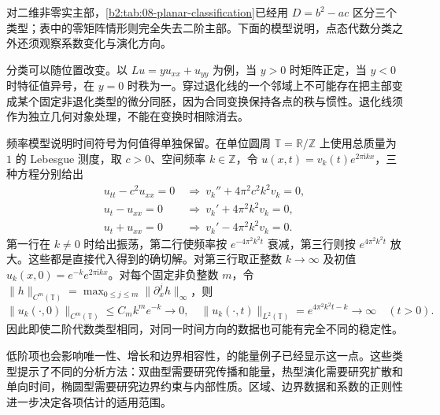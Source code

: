 对二维非零实主部，\cref{b2:tab:08-planar-classification}已经用 \(D=b^2-ac\) 区分三个类型；表中的零矩阵情形则完全失去二阶主部。下面的模型说明，点态代数分类之外还须观察系数变化与演化方向。

\ProseParagraphBreak

分类可以随位置改变。以 \(Lu=y u_{xx}+u_{yy}\) 为例，当 \(y>0\) 时矩阵正定，当 \(y<0\) 时特征值异号，在 \(y=0\) 时秩为一。穿过退化线的一个邻域上不可能存在把主部变成某个固定非退化类型的微分同胚，因为合同变换保持各点的秩与惯性。退化线须作为独立几何对象处理，不能在变换时相除消去。

\ProseParagraphBreak

频率模型说明时间符号为何值得单独保留。在单位圆周 \(\mathbb T=\mathbb R/\mathbb Z\) 上使用总质量为 \(1\) 的 Lebesgue 测度，取 \(c>0\)、空间频率 \(k\in\mathbb Z\)，令 \(u(x,t)=v_k(t)e^{2\pi\mathrm i kx}\)，三种方程分别给出
\[
 \begin{aligned}
 u_{tt}-c^2u_{xx}=0&\ \Longrightarrow\ v_k''+4\pi^2c^2k^2v_k=0,\\
 u_t-u_{xx}=0&\ \Longrightarrow\ v_k'+4\pi^2k^2v_k=0,\\
 u_t+u_{xx}=0&\ \Longrightarrow\ v_k'-4\pi^2k^2v_k=0.
 \end{aligned}
\]
第一行在 \(k\ne0\) 时给出振荡，第二行使频率按 \(e^{-4\pi^2k^2t}\) 衰减，第三行则按 \(e^{4\pi^2k^2t}\) 放大。这些都是直接代入得到的确切解。对第三行取正整数 \(k\to\infty\) 及初值 \(u_k(x,0)=e^{-k}e^{2\pi\mathrm i kx}\)。对每个固定非负整数 \(m\)，令 \(\|h\|_{C^m(\mathbb T)}=\max_{0\leq j\leq m}\|\partial_x^jh\|_\infty\)，则
\[
 \|u_k(\cdot,0)\|_{C^m(\mathbb T)}
 \leq C_m k^m e^{-k}\longrightarrow0,
 \quad \|u_k(\cdot,t)\|_{L^2(\mathbb T)}
 =e^{4\pi^2k^2t-k}\longrightarrow\infty\quad(t>0).
\]
因此即使二阶代数类型相同，对同一时间方向的数据也可能有完全不同的稳定性。

\ProseParagraphBreak

低阶项也会影响唯一性、增长和边界相容性，的能量例子已经显示这一点。这些类型提示了不同的分析方法：双曲型需要研究传播和能量，热型演化需要研究扩散和单向时间，椭圆型需要研究边界约束与内部性质。区域、边界数据和系数的正则性进一步决定各项估计的适用范围。
